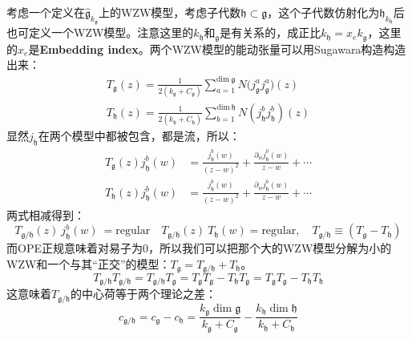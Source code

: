 考虑一个定义在$\hat{\mathfrak{g}}_{k_{\mathfrak{g}}}$上的WZW模型，考虑子代数$\mathfrak{h}\subset{\mathfrak{g}}$，这个子代数仿射化为$\hat{\mathfrak{h}}_{k_{\mathfrak{h}}}$后也可定义一个WZW模型。注意这里的$k_{\mathfrak{h}}$和$_{\mathfrak{g}}$是有关系的，成正比$k_{\mathfrak{h}}=x_ek_{\mathfrak{g}}$，这里的$x_e$是\textbf{Embedding index}。两个WZW模型的能动张量可以用Sugawara构造构造出来：
\begin{equation}
	\begin{gathered}
		T_{\mathfrak{g}}(z) =\frac1{2\left(k_{\mathfrak{g}}+C_{\mathfrak{g}}\right)}\sum_{a=1}^{\mathrm{dim~}\mathfrak{g}}N\bigl(j_{\mathfrak{g}}^{a}j_{\mathfrak{g}}^{a}\bigr)(z) \\
		T_{\mathfrak{h}}(z) =\frac1{2\left(k_{\mathfrak{h}}+C_{\mathfrak{h}}\right)}\sum_{b=1}^{\mathrm{dim~}\mathfrak{h}}N{\left(j_{\mathfrak{h}}^{b}j_{\mathfrak{h}}^{b}\right)}(z) 
	\end{gathered}
\end{equation}
显然$j_\mathfrak{h}$在两个模型中都被包含，都是流，所以：
\begin{equation}
	\begin{aligned}T_{\mathfrak{g}}(z)j_{\mathfrak{h}}^b(w)&=\frac{j_{\mathfrak{h}}^b(w)}{(z-w)^2}+\frac{\partial_wj_{\mathfrak{h}}^b(w)}{z-w}+\cdots\\T_{\mathfrak{h}}(z)j_{\mathfrak{h}}^b(w)&=\frac{j_{\mathfrak{h}}^b(w)}{(z-w)^2}+\frac{\partial_wj_{\mathfrak{h}}^b(w)}{z-w}+\cdots\end{aligned}
\end{equation}
两式相减得到：
\begin{equation}
	T_{\mathfrak{g}/\mathfrak{h}}(z)~j_{\mathfrak{h}}^{b}(w)~=\text{regular}\quad T_{\mathfrak{g}/\mathfrak{h}}(z)~T_{\mathfrak{h}}(w)=\text{regular},\quad T_{\mathfrak{g}/\mathfrak{h}}\equiv\left(T_{\mathfrak{g}}-T_{\mathfrak{h}}\right)
\end{equation}
而OPE正规意味着对易子为0，所以我们可以把那个大的WZW模型分解为小的WZW和一个与其“正交”的模型：$T_\mathfrak{g}=T_{\mathfrak{g}/\mathfrak{h}}+T_\mathfrak{h}$。
\begin{equation}
	T_{\mathfrak{g}/\mathfrak{h}}T_{\mathfrak{g}/\mathfrak{h}}=T_{\mathfrak{g}/\mathfrak{h}}T_{\mathfrak{g}}=T_{\mathfrak{g}}T_{\mathfrak{g}}-T_{\mathfrak{h}}T_{\mathfrak{g}}=T_{\mathfrak{g}}T_{\mathfrak{g}}-T_{\mathfrak{h}}T_{\mathfrak{h}}
\end{equation}
这意味着$T_{{\mathfrak{g}/\mathfrak{h}}}$的中心荷等于两个理论之差：
\begin{equation}
	\boxed{
		c_{\mathfrak{g}/\mathfrak{h}}=c_{\mathfrak{g}}-c_{\mathfrak{h}}=\frac{k_{\mathfrak{g}}\dim\mathfrak{g}}{k_{\mathfrak{g}}+C_{\mathfrak{g}}}-\frac{k_{\mathfrak{h}}\dim\mathfrak{h}}{k_{\mathfrak{h}}+C_{\mathfrak{h}}}
	}
\end{equation}
